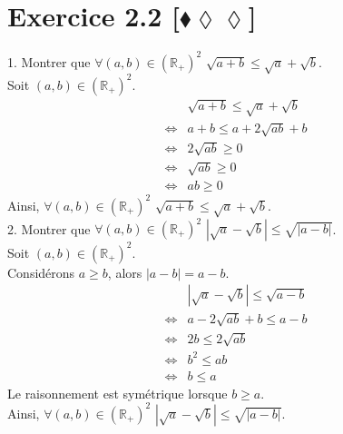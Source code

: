 \documentclass[10pt]{article}
\begin{document}
\section*{Exercice 2.2 [$\blacklozenge\lozenge\lozenge$]}
\begin{tcolorbox}[enhanced, width=6in, center, size=fbox, fontupper=\large, drop shadow southwest]
    1. Montrer que $\forall(a,b)\in(\mathbb{R}_+)^2$ $\sqrt{a+b}\leq\sqrt{a}+\sqrt{b}$.\\
    Soit $(a,b)\in(\mathbb{R}_+)^2$.
    \begin{align*}
        &\sqrt{a+b}\leq\sqrt{a}+\sqrt{b}\\
        \iff&a+b\leq a + 2\sqrt{ab} + b\\
        \iff&2\sqrt{ab} \geq 0\\
        \iff&\sqrt{ab} \geq 0\\
        \iff&ab \geq 0
    \end{align*}
    Ainsi, $\forall(a,b)\in(\mathbb{R}_+)^2$ $\sqrt{a+b}\leq\sqrt{a}+\sqrt{b}$.\\[0.5cm]
    2. Montrer que $\forall(a,b)\in(\mathbb{R}_+)^2$ $|\sqrt{a}-\sqrt{b}|\leq\sqrt{|a-b|}$.\\
    Soit $(a,b)\in(\mathbb{R}_+)^2$.\\
    Considérons $a\geq b$, alors $|a-b| = a-b$.
    \begin{align*}
        &|\sqrt{a}-\sqrt{b}|\leq\sqrt{a-b}\\
        \iff& a - 2\sqrt{ab} + b \leq a-b\\
        \iff& 2b \leq 2\sqrt{ab}\\
        \iff& b^2 \leq ab\\
        \iff&b \leq a
    \end{align*}
    Le raisonnement est symétrique lorsque $b\geq a$.\\
    Ainsi, $\forall(a,b)\in(\mathbb{R}_+)^2$ $|\sqrt{a}-\sqrt{b}|\leq\sqrt{|a-b|}$.
\end{tcolorbox}
\end{document}

